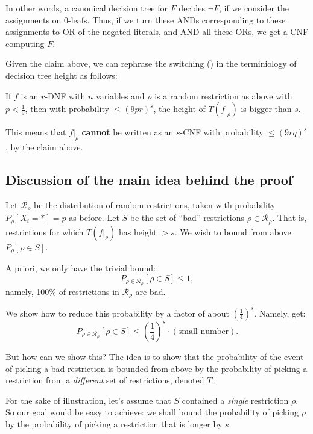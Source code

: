 In other words, a canonical decision tree for \( F \) decides \( \neg F \),
if we consider the assignments on 0-leafs.
Thus, if we turn these ANDs corresponding to these assignments to OR of the negated literals, and AND all these ORs, 
we get a CNF computing \( F \).

Given the  claim above, we can rephrase the switching () in the terminiology of decision tree height as follows: 

\begin{theorem}\label{thm:SL-DT-version}
If \( f \) is an \( r \)-DNF with \( n \) variables 
and \( \rho \) is a random restriction as above with 
\( p < \frac{1}{9} \),
then with probability \( \leq (9pr)^s \), the height of \( T(f|_{\rho}) \) 
is bigger than \( s \).
\end{theorem}

This means that \( f|_{\rho} \) \textbf{cannot} be written as an \( s \)-CNF 
with probability \( \leq (9rq)^s \), by the claim above.

\subsection*{Discussion of the main idea behind the proof}

Let \( \mathcal{R}_{\rho} \) be the distribution of random restrictions, 
taken with probability \( P_{\rho}[X_i = *] = p \) as before.
Let \( S \) be the set of ``bad'' restrictions \( \rho \in \mathcal{R}_{\rho} \).
That is, restrictions for which \( T(f|_{\rho}) \) has height \( > s \).
We wish to bound from above \( P_{\rho}[\rho \in S] \).

A priori, we only have the trivial bound:
\[
P_{\rho \in \mathcal{R}_{\rho}}[\rho \in S] \leq 1,
\]
namely, 100\% of restrictions in \( \mathcal{R}_{\rho} \) are bad.

We show how to reduce this probability by a factor of about \( \left( \frac{1}{4} \right)^s \).
Namely, get:
\[
P_{\rho \in \mathcal{R}_{\rho}}[\rho \in S] \leq \left( \frac{1}{4} \right)^s \cdot (\text{small number}).
\]

But how can we show this?
The idea is to show that the probability of the event of picking a bad restriction 
is bounded from above by the probability of picking a restriction from a \emph{different} 
set of restrictions, denoted \( T \).

For the sake of illustration, let's assume that  \( S \) contained a \emph{single} restriction \( \rho \). So our goal would be easy to achieve: we shall bound the probability of picking $\rho$ by the probability of picking a restriction that is longer by  $s$  

